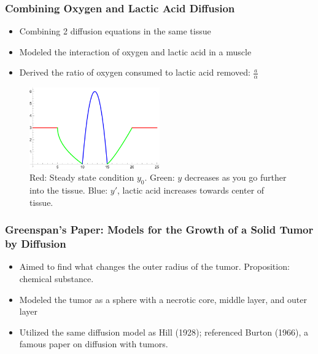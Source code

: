 \documentclass{beamer}
\begin{document}
\begin{frame}
  \frametitle{Combining Oxygen and Lactic Acid Diffusion}
  \begin{itemize}
    \item Combining 2 diffusion equations in the same tissue
    \item Modeled the interaction of oxygen and lactic acid in a muscle
    \item Derived the ratio of oxygen consumed to lactic acid removed: $\frac{a}{\alpha}$
  \end{itemize}
    
  \begin{figure}[h!]
    \centering
    \includegraphics[width=0.5\textwidth]{graphics/image.png}
    \caption{Red: Steady state condition $y_0$. Green: $y$ decreases as you go further into the tissue. Blue: $y'$, lactic acid increases towards center of tissue.}
    \label{fig:image}
  \end{figure}

\end{frame}

\begin{frame}
  \frametitle{Greenspan's Paper: Models for the Growth of a Solid Tumor by Diffusion}
  \begin{itemize}
    \item Aimed to find what changes the outer radius of the tumor. Proposition: chemical substance.
    \item Modeled the tumor as a sphere with a necrotic core, middle layer, and outer layer
    \item Utilized the same diffusion model as Hill (1928); referenced Burton (1966), a famous paper on diffusion with tumors. 
  \end{itemize}
\end{frame}
\end{document}
